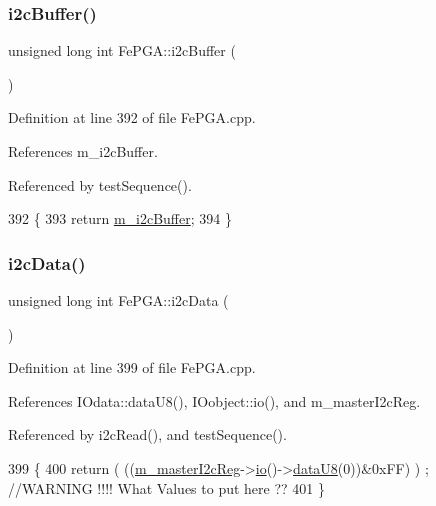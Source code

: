 \subsubsection{\texorpdfstring{i2c\+Buffer()}{i2cBuffer()}}
{\footnotesize\ttfamily unsigned long int Fe\+P\+G\+A\+::i2c\+Buffer (\begin{DoxyParamCaption}{ }\end{DoxyParamCaption})}



Definition at line 392 of file Fe\+P\+G\+A.\+cpp.



References m\+\_\+i2c\+Buffer.



Referenced by test\+Sequence().


\begin{DoxyCode}
392                                   \{
393   \textcolor{keywordflow}{return} \hyperlink{classFePGA_a173664ffd6a73f454ae31f51e689dd16}{m\_i2cBuffer};
394 \}
\end{DoxyCode}
\mbox{\label{classFePGA_a9c261a09d323c07ec4b9e925d4dfc353}} 
\subsubsection{\texorpdfstring{i2c\+Data()}{i2cData()}}
{\footnotesize\ttfamily unsigned long int Fe\+P\+G\+A\+::i2c\+Data (\begin{DoxyParamCaption}{ }\end{DoxyParamCaption})}



Definition at line 399 of file Fe\+P\+G\+A.\+cpp.



References I\+Odata\+::data\+U8(), I\+Oobject\+::io(), and m\+\_\+master\+I2c\+Reg.



Referenced by i2c\+Read(), and test\+Sequence().


\begin{DoxyCode}
399                                 \{
400   \textcolor{keywordflow}{return} ( ((\hyperlink{classFePGA_adb390ea8de4a6cbce648dc62e4405f32}{m\_masterI2cReg}->\hyperlink{classIOobject_af04fb94137c3d86849f478ac5afab5d1}{io}()->\hyperlink{classIOdata_a75e9c318dbac3a39402179070943d4bc}{dataU8}(0))&0xFF) ) ; \textcolor{comment}{//WARNING !!!! What Values to
       put here ??}
401 \}
\end{DoxyCode}
\mbox{\label{classFePGA_a210cf57766c4f818ea61af671e91cfeb}} 
